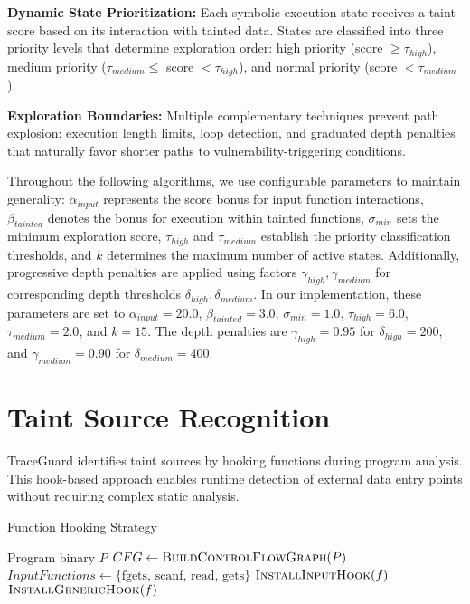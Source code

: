 \textbf{Dynamic State Prioritization:} Each symbolic execution state receives a taint score based on its interaction with tainted data. States are classified into three priority levels that determine exploration order: high priority (score $\geq \tau_{high}$), medium priority ($\tau_{medium} \leq$ score $< \tau_{high}$), and normal priority (score $< \tau_{medium}$).

\textbf{Exploration Boundaries:} Multiple complementary techniques prevent path explosion: execution length limits, loop detection, and graduated depth penalties that naturally favor shorter paths to vulnerability-triggering conditions.

\vspace{1em}

Throughout the following algorithms, we use configurable parameters to maintain generality: $\alpha_{input}$ represents the score bonus for input function interactions, $\beta_{tainted}$ denotes the bonus for execution within tainted functions, $\sigma_{min}$ sets the minimum exploration score, $\tau_{high}$ and $\tau_{medium}$ establish the priority classification thresholds, and $k$ determines the maximum number of active states. Additionally, progressive depth penalties are applied using factors $\gamma_{high}, \gamma_{medium}$ for corresponding depth thresholds $\delta_{high}, \delta_{medium}$. In our implementation, these parameters are set to $\alpha_{input} = 20.0$, $\beta_{tainted} = 3.0$, $\sigma_{min} = 1.0$, $\tau_{high} = 6.0$, $\tau_{medium} = 2.0$, and $k = 15$. The depth penalties are $\gamma_{high} = 0.95$ for $\delta_{high} = 200$, and $\gamma_{medium} = 0.90$ for $\delta_{medium} = 400$.

\section{Taint Source Recognition}

TraceGuard identifies taint sources by hooking functions during program analysis. This hook-based approach enables runtime detection of external data entry points without requiring complex static analysis.

\begin{algorithm}[H]
    \caption{Function Hooking Strategy}
    \label{alg:function_hooking}
    \begin{algorithmic}[1]
        \Require Program binary $P$
        \State $CFG \gets \textsc{BuildControlFlowGraph}(P)$
        \State $InputFunctions \gets \{\text{fgets, scanf, read, gets}\}$
        \State $\textsc{InstallInputHook}(f)$
        \Else
        \State $\textsc{InstallGenericHook}(f)$
        \EndIf
        \EndFor
    \end{algorithmic}
\end{algorithm}

